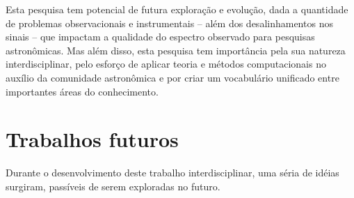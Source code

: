 Esta pesquisa tem potencial de futura exploração e evolução, dada a quantidade de problemas observacionais e instrumentais -- além dos desalinhamentos nos sinais -- que impactam a qualidade do espectro observado para pesquisas astronômicas. Mas além disso, esta pesquisa tem importância pela sua natureza interdisciplinar, pelo esforço de aplicar teoria e métodos computacionais no auxílio da comunidade astronômica e por criar um vocabulário unificado entre importantes áreas do conhecimento.

\section{Trabalhos futuros}

Durante o desenvolvimento deste trabalho interdisciplinar, uma séria de idéias surgiram, passíveis de serem exploradas no futuro. 


